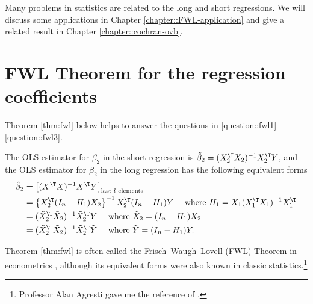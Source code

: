 Many problems in statistics are related to the long and short regressions. We will discuss some applications in Chapter \ref{chapter::FWL-application} and give a related result in Chapter \ref{chapter::cochran-ovb}. 

 

\section{FWL Theorem for the regression coefficients}

Theorem \ref{thm:fwl} below helps to answer the questions in \eqref{question::fwl1}--\eqref{question::fwl3}.
 
\begin{theorem}
\label{thm:fwl}The OLS estimator for $\beta_2$ in the short regression is $\tilde{\beta}_{2}=(X_{2}^{\T}X_{2})^{-1}X_{2}^{\T}Y$, and the OLS estimator for $\beta_{2}$ in the long regression has
the following equivalent forms
\begin{align}
\hat{\beta}_{2} & =\left[(X^{\T}X)^{-1}X^{\T}Y\right]_{\textup{last }l\textup{ elements}}\label{eq:fwl1}\\
 & =\left\{ X_{2}^{\T}(I_{n}-H_{1})X_{2}\right\} ^{-1}X_{2}^{\T}(I_{n}-H_{1})Y\quad\text{ where }H_{1}=X_{1}(X_{1}^{\T}X_{1})^{-1}X_{1}^{\T}  \label{eq:fwl2}\\
 & =(\tilde{X}_{2}^{\T}\tilde{X}_{2})^{-1}\tilde{X}_{2}^{\T}Y\quad\text{ where }\tilde{X}_{2}=(I_{n}-H_{1})X_{2}\label{eq:fwl3}\\
 & =(\tilde{X}_{2}^{\T}\tilde{X}_{2})^{-1}\tilde{X}_{2}^{\T}\tilde{Y}\quad\text{ where }\tilde{Y}=(I_{n}-H_{1})Y.\label{eq:fwl4}
\end{align}
\end{theorem}

Theorem \ref{thm:fwl} is often called the  Frisch--Waugh--Lovell (FWL) Theorem in econometrics \citep{frisch1933partial, lovell1963seasonal}, although its equivalent forms were also known in classic statistics.\footnote{Professor Alan Agresti gave me the reference of \citet{yule1907theory}.} 




